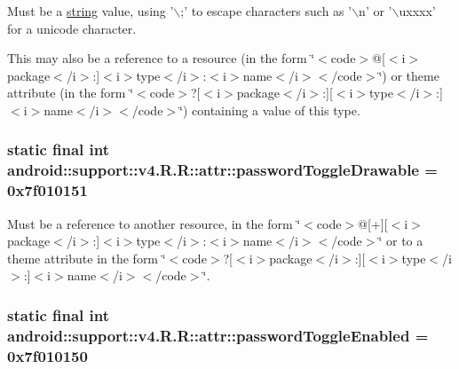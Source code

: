 Must be a \hyperlink{classandroid_1_1support_1_1v4_1_1_r_1_1string}{string} value, using '$\backslash$;' to escape characters such as '$\backslash$n' or '$\backslash$uxxxx' for a unicode character. 

This may also be a reference to a resource (in the form \char`\"{}$<$code$>$@\mbox{[}$<$i$>$package$<$/i$>$:\mbox{]}$<$i$>$type$<$/i$>$:$<$i$>$name$<$/i$>$$<$/code$>$\char`\"{}) or theme attribute (in the form \char`\"{}$<$code$>$?\mbox{[}$<$i$>$package$<$/i$>$:\mbox{]}\mbox{[}$<$i$>$type$<$/i$>$:\mbox{]}$<$i$>$name$<$/i$>$$<$/code$>$\char`\"{}) containing a value of this type. \hypertarget{classandroid_1_1support_1_1v4_1_1_r_1_1attr_4ddde9a3b68f61c91b34809139656822}{
\subsubsection[{passwordToggleDrawable}]{\setlength{\rightskip}{0pt plus 5cm}static final int android::support::v4.R.R::attr::passwordToggleDrawable = 0x7f010151}}
\label{classandroid_1_1support_1_1v4_1_1_r_1_1attr_4ddde9a3b68f61c91b34809139656822}


Must be a reference to another resource, in the form \char`\"{}$<$code$>$@\mbox{[}+\mbox{]}\mbox{[}$<$i$>$package$<$/i$>$:\mbox{]}$<$i$>$type$<$/i$>$:$<$i$>$name$<$/i$>$$<$/code$>$\char`\"{} or to a theme attribute in the form \char`\"{}$<$code$>$?\mbox{[}$<$i$>$package$<$/i$>$:\mbox{]}\mbox{[}$<$i$>$type$<$/i$>$:\mbox{]}$<$i$>$name$<$/i$>$$<$/code$>$\char`\"{}. \hypertarget{classandroid_1_1support_1_1v4_1_1_r_1_1attr_49b78da2ee304c23dbad49022a91bb97}{
\subsubsection[{passwordToggleEnabled}]{\setlength{\rightskip}{0pt plus 5cm}static final int android::support::v4.R.R::attr::passwordToggleEnabled = 0x7f010150}}
\label{classandroid_1_1support_1_1v4_1_1_r_1_1attr_49b78da2ee304c23dbad49022a91bb97}


